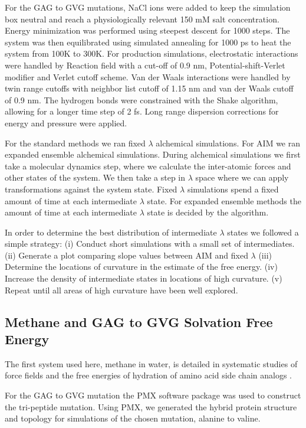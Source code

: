 \documentclass[fleqn,10pt,lineno]{wlpeerj} %
\begin{document}
For the GAG to GVG mutations, NaCl ions were added to keep the simulation box neutral and reach a physiologically relevant 150 mM salt concentration. Energy minimization was performed using steepest descent for 1000 steps. The system was then equilibrated using simulated annealing for 1000 ps to heat the system from 100K to 300K. For production simulations, electrostatic interactions were handled by Reaction field with a cut-off of 0.9 nm, Potential-shift-Verlet modifier and Verlet cutoff scheme. Van der Waals interactions were handled by twin range cutoffs with neighbor list cutoff of 1.15 nm and van der Waals cutoff of 0.9 nm. The hydrogen bonds were constrained with the Shake algorithm, allowing for a longer time step of 2 fs. Long range dispersion corrections for energy and pressure were applied. 

For the standard methods we ran fixed $\lambda$ alchemical simulations. For AIM we ran expanded ensemble alchemical simulations. During alchemical simulations we first take a molecular dynamics step, where we calculate the inter-atomic forces and other states of the system. We then take a step in $\lambda$ space where we can apply transformations against the system state. Fixed $\lambda$ simulations spend a fixed amount of time at each intermediate $\lambda$ state. For expanded ensemble methods the amount of time at each intermediate $\lambda$ state is decided by the algorithm.

In order to determine the best distribution of intermediate $\lambda$ states we followed a simple strategy:
(i) Conduct short simulations with a small set of intermediates.
(ii) Generate a plot comparing slope values between AIM and fixed $\lambda$
(iii) Determine the locations of curvature in the estimate of the free energy.
(iv) Increase the density of intermediate states in locations of high curvature.
(v) Repeat until all areas of high curvature have been well explored.

\subsection*{Methane and GAG to GVG Solvation Free Energy} \label{freeenergy}

The first system used here, methane in water, is detailed in systematic studies of force fields and the free energies of hydration of amino acid side chain analogs \cite{Sun1992,Lyubartsev1996,Chodera2011,Paliwal2011}.

For the GAG to GVG mutation the PMX \citep{Gapsys2015} software package was used to construct the tri-peptide mutation. Using PMX, we generated the hybrid protein structure and topology for simulations of the chosen mutation, alanine to valine.
\end{document}

